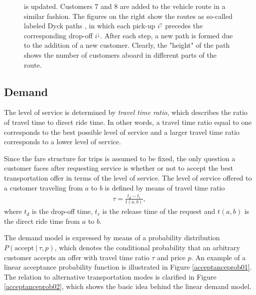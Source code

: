 \documentclass[dissertation,draft*]{aaltoseries}
\begin{document}
\begin{figure}
\begin{center}
{is updated. Customers $7$ and $8$ are added to the vehicle route in a similar fashion.
The figures on the right show the routes as so-called labeled Dyck 
paths \citep{cori, eadarp},
in which each pick-up $i^{\uparrow}$ precedes the corresponding drop-off $i^{\downarrow}$. 
After each step, a new path is formed due to the addition of a new customer. Clearly, the "height" of the path
shows the number of customers aboard in different parts of the route.
}
\label{dynamicexample07}
\end{center}
\end{figure}

\subsection{Demand}
The level of service is determined by \emph{travel time ratio}, which describes the ratio of travel time to direct ride time.
In other words, a travel time ratio equal to one corresponds to the best possible level of service and 
a larger travel time ratio corresponds to a lower level of service. 

Since the fare structure for trips is assumed to be fixed, 
the only question a customer faces after requesting service is whether or not to accept the best transportation offer in terms
of the level of service. 
The level of service offered to a customer traveling from $a$ to $b$ is defined by means of travel time ratio
\begin{align}
\tau=\frac{t_d-t_r}{t(a,b)},
\end{align}
where $t_d$ is the drop-off time, $t_r$ is the release time of the request and $t(a,b)$ is the direct ride time from $a$ to $b$. 

The demand model is expressed by means of a probability distribution $P(\mbox{accept} \ | \ \tau,p)$, which denotes the conditional probability that an arbitrary customer accepts an offer with travel time ratio $\tau$ and price $p$. 
An example of a linear acceptance probability function is illustrated in Figure \ref{acceptanceprob01}. The relation to alternative transportation modes is clarified in Figure \ref{acceptanceprob02}, which shows the basic idea behind the linear demand model.
\end{document}
